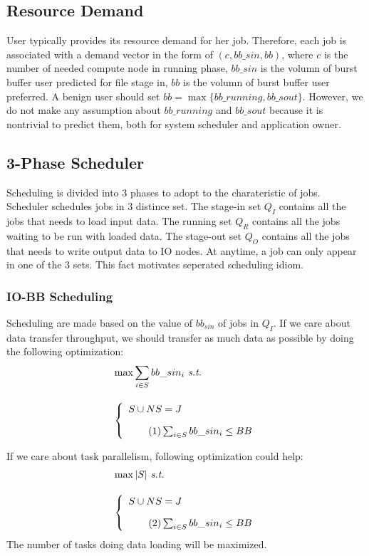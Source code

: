 \documentclass[conference,compsoc]{IEEEtran}
\newcommand\numberthis{\addtocounter{equation}{1}\tag{\theequation}}
\begin{document}
\subsection{Resource Demand}
User typically provides its resource demand for her job.
Therefore, each job is associated with a demand vector in the form of $(c, bb\_sin, bb)$,
where $c$ is the number of needed compute node in running phase,
$bb\_sin$ is the volumn of burst buffer user predicted for file stage in,
$bb$ is the volumn of burst buffer user preferred.
A benign user should set $bb = \max\{bb\_running, bb\_sout\}$.
However, we do not make any assumption about $bb\_running$ and $bb\_sout$ because it is nontrivial to predict them,
both for system scheduler and application owner.

\subsection{3-Phase Scheduler}
Scheduling is divided into 3 phases to adopt to the charateristic of jobs.
Scheduler schedules jobs in 3 distince set.
The stage-in set $Q_I$ contains all the jobs that needs to load input data.
The running set $Q_R$ contains all the jobs waiting to be run with loaded data.
The stage-out set $Q_O$ contains all the jobs that needs to write output data to IO nodes.
At anytime, a job can only appear in one of the 3 sets.
This fact motivates seperated scheduling idiom.

\subsubsection*{IO-BB Scheduling}
Scheduling are made based on the value of $bb_{sin}$ of jobs in $Q_I$.
If we care about data transfer throughput, 
we should transfer as much data as possible by doing the following optimization:
\begin{align*}
        & \max \sum_{i\in S} bb\_sin_i \textit{   s.t.}\\[1em]
        & \left\{
                \begin{array}{l}
                        S \cup NS = J \\ [1em] \numberthis \label{Equ:MaxTransferData} 
                        \sum_{i\in S} bb\_sin_i \leq BB
                \end{array} 
        \right.
\end{align*}	

If we care about task parallelism, following optimization could help:
\begin{align*}
        & \max |S| \textit{   s.t.} \\[1em]
        & \left\{
                \begin{array}{l}
                        S \cup NS = J \\ [1em] \numberthis \label{Equ:MaxTaskNumber} 
                        \sum_{i\in S} bb\_sin_i \leq BB
                \end{array} 
        \right.
\end{align*}
The number of tasks doing data loading will be maximized.
\end{document}

